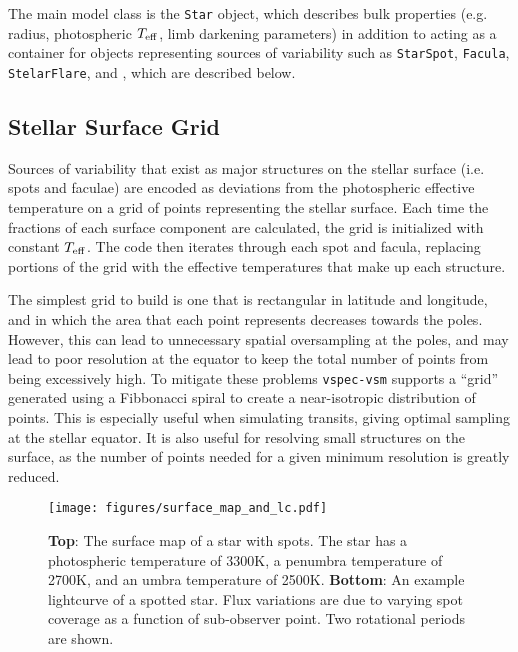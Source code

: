 \documentclass[twocolumn]{aastex631}
\newcommand{\teff}{$T_{\rm eff}$}
\begin{document}
The main model class is the \texttt{Star} object, which describes bulk properties (e.g. radius, photospheric \teff, limb darkening parameters) in addition to acting as 
a container for objects representing sources of variability such as \texttt{StarSpot}, \texttt{Facula}, \texttt{StelarFlare}, and , which are described below.

\subsection{Stellar Surface Grid}
Sources of variability that exist as major structures on the stellar surface (i.e. spots and faculae) are encoded as deviations from the photospheric effective temperature on a grid of points representing the stellar surface. Each time the fractions of each surface component are calculated, the grid is initialized with constant \teff. The code then iterates through each spot and facula, replacing portions of the grid with the effective temperatures that make up each structure.

The simplest grid to build is one that is rectangular in latitude and longitude, and in which the area that each point represents decreases towards the poles. However, this can lead to unnecessary spatial oversampling at the poles, and may lead to poor resolution at the equator to keep the total number of points from being excessively high. To mitigate these problems \texttt{vspec-vsm} supports a ``grid'' generated using a Fibbonacci spiral to create a near-isotropic distribution of points. This is especially useful when simulating transits, giving optimal sampling at the stellar equator. It is also useful for resolving small structures on the surface, as the number of points needed for a given minimum resolution is greatly reduced.


\begin{figure}
    \centering
        \texttt{[image: figures/surface\_map\_and\_lc.pdf]}
    \caption{{\bf Top}: The surface map of a star with spots. The star has a photospheric temperature of 3300K, a penumbra temperature of 2700K, and an umbra temperature of 2500K.
    {\bf Bottom}: An example lightcurve of a spotted star. Flux variations are due to varying spot coverage as a function of sub-observer point. Two rotational periods are shown.
    }
    \label{fig:surface_map}
\end{figure}
\end{document}
